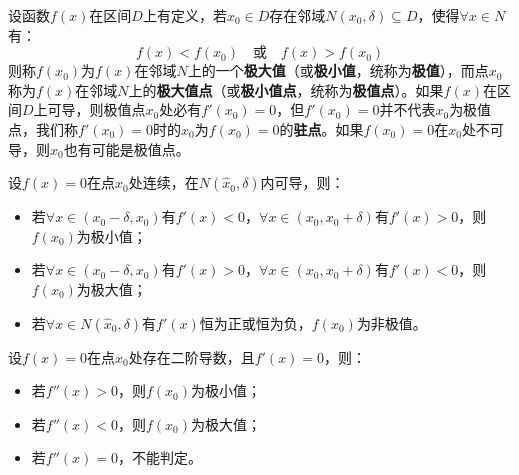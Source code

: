 \begin{definition}[极值和极值点]
设函数$f\left( x \right) $在区间$D$上有定义，若$x_0\in D$存在邻域$N\left( x_0,\delta \right) \subseteq D$，使得$\forall x\in N$有：
\[
f\left( x \right) <f\left( x_0 \right) \quad \text{或} \quad f\left( x \right) >f\left( x_0 \right)
\]
则称$f\left( x_0 \right) $为$f\left( x \right) $在邻域$N$上的一个{\bf 极大值}（或{\bf 极小值}，统称为{\bf 极值}），而点$x_0$称为$f\left( x \right) $在邻域$N$上的{\bf 极大值点}（或{\bf 极小值点}，统称为{\bf 极值点}）。如果$f\left( x \right) $在区间$D$上可导，则极值点$x_0$处必有$f'\left( x_0 \right) =0$，但$f'\left( x_0 \right) =0$并不代表$x_0$为极值点，我们称$f'\left( x_0 \right) =0$时的$x_0$为$f\left( x_0 \right) =0$的{\bf 驻点}。如果$f\left( x_0 \right) =0$在$x_0$处不可导，则$x_0$也有可能是极值点。
\end{definition}

\begin{theorem} \label{th_5_3_1}
设$f\left( x \right) =0$在点$x_0$处连续，在$N\left( \hat{x}_0,\delta \right) $内可导，则：
\begin{itemize}
    \item 若$\forall x\in \left( x_0-\delta ,x_0 \right) $有$f'\left( x \right) <0$，$\forall x\in \left( x_0,x_0+\delta \right) $有$f'\left( x \right) >0$，则$f\left( x_0 \right) $为极小值；
    \item 若$\forall x\in \left( x_0-\delta ,x_0 \right) $有$f'\left( x \right) >0$，$\forall x\in \left( x_0,x_0+\delta \right) $有$f'\left( x \right) <0$，则$f\left( x_0 \right) $为极大值；
    \item 若$\forall x\in N\left( \hat{x}_0,\delta \right) $有$f'\left( x \right) $恒为正或恒为负，$f\left( x_0 \right) $为非极值。
\end{itemize}
\end{theorem}

\begin{theorem} \label{th_5_3_2}
设$f\left( x \right) =0$在点$x_0$处存在二阶导数，且$f'\left( x \right) =0$，则：
\begin{itemize}
    \item 若$f''\left( x \right) >0$，则$f\left( x_0 \right) $为极小值；
    \item 若$f''\left( x \right) <0$，则$f\left( x_0 \right) $为极大值；
    \item 若$f''\left( x \right) =0$，不能判定。
\end{itemize}
\end{theorem}

